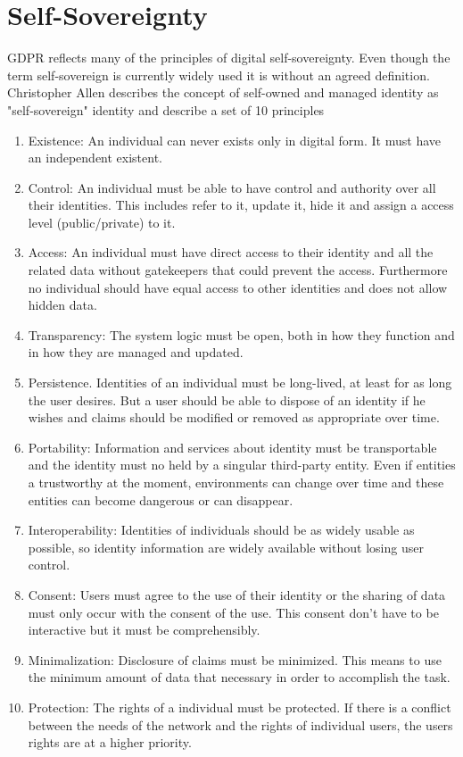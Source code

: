 \section{Self-Sovereignty}\label{Self-Sovereignty}

GDPR reflects many of the principles of digital self-sovereignty. Even though the term self-sovereign is currently widely used it is without an agreed definition. Christopher Allen describes the concept of self-owned and managed identity as "self-sovereign" identity and describe a set of 10 principles \citep{selfSov} 

\begin{enumerate}
\item Existence: An individual can never exists only in digital form. It must have an independent existent.
\item Control: An individual must be able to have control and authority over all their identities. This includes refer to it, update it, hide it and assign a access level (public/private) to it.
\item Access: An individual must have direct access to their identity and all the related data without gatekeepers that could prevent the access. Furthermore no individual should have equal access to other identities and does not allow hidden data.
\item Transparency: The system logic must be open, both in how they function and in how they are managed and updated.
\item Persistence. Identities of an individual must be long-lived, at least for as long the user desires. But a user should be able to dispose of an identity if he wishes and claims should be modified or removed as appropriate over time.
\item Portability: Information and services about identity must be transportable and the identity must no held by a singular third-party entity. Even if entities a trustworthy at the moment, environments can change over time and these entities can become dangerous or can disappear. 
\item Interoperability: Identities of individuals should be as widely usable as possible, so identity information are widely available without losing user control.
\item Consent:  Users must agree to the use of their identity or the sharing of data must only occur with the consent of the use. This consent don't have to be interactive but it must be comprehensibly.
\item Minimalization:  Disclosure of claims must be minimized. This means to use the minimum amount of data that necessary in order to accomplish the task.
\item Protection: The rights of a individual must be protected. If there is a conflict between the needs of the network and the rights of individual users, the users rights are at a higher priority.
\end{enumerate}

